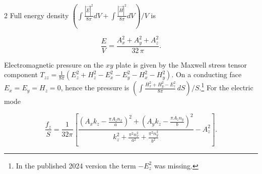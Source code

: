 \documentclass[twoside, 10pt]{article}
\begin{document}
\begin{multicols}{2}
    Full energy density
\(\left(\int \frac{|\vec{E}|^2}{8 \pi}dV + \int \frac{|\vec{H}|^2}{8 \pi}dV\right)\big/{V}\)
is

\begin{equation}\frac{E}{V} = \frac{{A_{x}^{2} + A_{y}^{2} + A_{z}^{2}}}{32 \, \pi}.\end{equation}

    Electromagnetic pressure on the \(xy\) plate is given by the Maxwell stress tensor component
\(T_{zz}=\frac1{8\pi}\left(E_z^2+H_z^2-E_x^2-E_y^2-H_x^2-H_y^2\right)\). On a conducting face
\(E_x=E_y=H_z=0\), hence the pressure is
\(\left(\int \frac{H_x^2+H_y^2-E_z^2}{8\pi}\,dS\right)\big/S\).\footnote{In the published 2024 version the term \(-E_z^2\) was missing.} For the electric mode

\end{multicols}

\begin{equation}\frac{f_z}{S} = \frac{1}{32\pi}\left[\frac{\left(A_{x} k_{z} - \frac{\pi A_{z} n_{x}}{a}\right)^{2} + \left(A_{y} k_{z} - \frac{\pi A_{z} n_{y}}{b}\right)^{2}}{k_{z}^{2} + \frac{\pi^{2} n_{x}^{2}}{a^{2}} + \frac{\pi^{2} n_{y}^{2}}{b^{2}}} - A_{z}^{2}\right].\end{equation}
\end{document}
